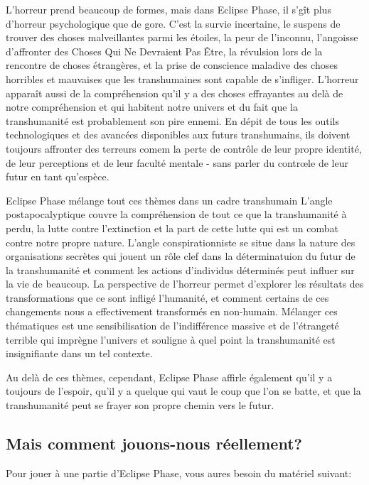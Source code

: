 L'horreur prend beaucoup de formes, mais dans Eclipse Phase, il s'gît plus d'horreur psychologique que de gore. C'est la survie incertaine, le suspens de trouver des choses malveillantes parmi les étoiles, la peur de l'inconnu, l'angoisse d'affronter des Choses Qui Ne Devraient Pas Être, la révulsion lors de la rencontre de choses étrangères, et la prise de conscience maladive des choses horribles et mauvaises que les transhumaines sont capable de s'infliger. L'horreur apparaît aussi de la compréhension qu'il y a des choses effrayantes au delà de notre compréhension et qui habitent notre univers et du fait que la transhumanité est probablement son pire ennemi. En dépit de tous les outils technologiques et des avancées disponibles aux futurs transhumains, ils doivent toujours affronter des terreurs comem la perte de contrôle de leur propre identité, de leur perceptions et de leur faculté mentale - sans parler du contrœle de leur futur en tant qu'espèce. 

Eclipse Phase mélange tout ces thèmes dans un cadre transhumain L'angle postapocalyptique couvre la compréhension de tout ce que la transhumanité à perdu, la lutte contre l'extinction et la part de cette lutte qui est un combat contre notre propre nature. L'angle conspirationniste se situe dans la nature des organisations secrètes qui jouent un rôle clef dans la déterminatuion du futur de la transhumanité et comment les actions d'individus déterminés peut influer sur la vie de beaucoup. La perspective de l'horreur permet d'explorer les résultats des transformations que ce sont infligé l'humanité, et comment certains de ces changements nous a effectivement transformés en non-humain. Mélanger ces thématiques est une sensibilisation de l'indifférence massive et de l'étrangeté terrible qui imprègne l'univers et souligne à quel point la transhumanité est insignifiante dans un tel contexte. 

Au delà de ces thèmes, cependant, Eclipse Phase affirle également qu'il y a toujours de l'espoir, qu'il y a quelque qui vaut le coup que l'on se batte, et que la transhumanité peut se frayer son propre chemin vers le futur. 



\subsection{Mais comment jouons-nous réellement?} \label{sec:but-how-do} 

Pour jouer à une partie d'Eclipse Phase, vous aures besoin du matériel suivant: 

